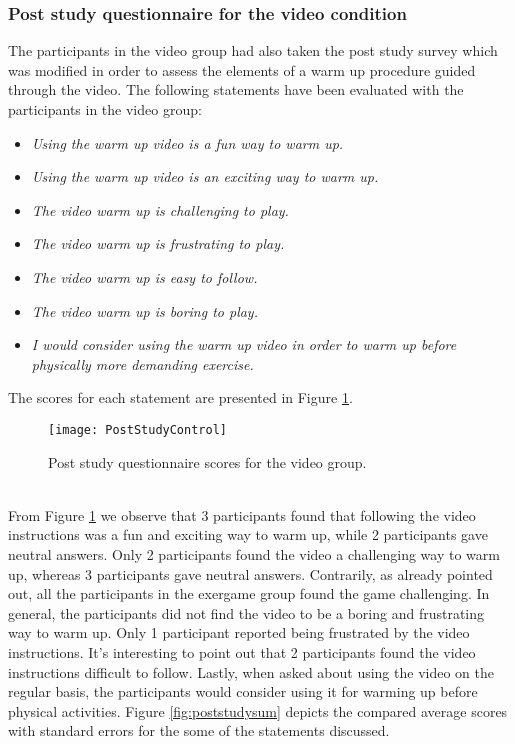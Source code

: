 \subsubsection{Post study questionnaire for the video condition} 
The participants in the video group had also taken the post study survey which was modified in order to assess the elements of a warm up procedure guided through the video. The following statements have been evaluated with the participants in the video group:
\begin{itemize}
\item \textit{Using the warm up video is a fun way to warm up.}
\item \textit{Using the warm up video is an exciting way to warm up.}
\item \textit{The video warm up is challenging to play.}
\item \textit{The video warm up is frustrating to play.}
\item \textit{The video warm up is easy to follow.}
\item \textit{The video warm up is boring to play.}
\item \textit{I would consider using the warm up video in order to warm up before physically more demanding exercise.}
\end{itemize}
The scores for each statement are presented in Figure \ref{fig:poststudycontrol}.\\
\begin{figure}[h]
    \centering
    \texttt{[image: PostStudyControl]}
    \caption{Post study questionnaire scores for the video group.}
    \label{fig:poststudycontrol}
\end{figure}\\
From Figure \ref{fig:poststudycontrol} we observe that 3 participants found that following the video instructions was a fun and exciting way to warm up, while 2 participants gave neutral answers. Only 2 participants found the video a challenging way to warm up, whereas 3 participants gave neutral answers. Contrarily, as already pointed out, all the participants in the exergame group found the game challenging. In general, the participants did not find the video to be a boring and frustrating way to warm up. Only 1 participant reported being frustrated by the video instructions. It's interesting to point out that 2 participants found the video instructions difficult to follow. Lastly, when asked about using the video on the regular basis, the participants would consider using it for warming up before physical activities. Figure \ref{fig:poststudysum} depicts the compared average scores with standard errors for the some of the statements discussed.\pagebreak
